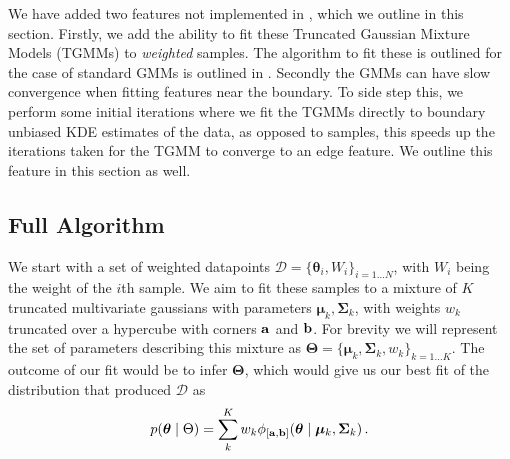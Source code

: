\documentclass[twocolumn,usenames,dvipsnames,linenumbers]{aastex631}
\newcommand{\btheta}{\boldsymbol{\theta}}
\newcommand{\bmu}{\boldsymbol{\mu}}
\newcommand{\bSigma}{\boldsymbol{\Sigma}}
\newcommand{\ba}{{\bf a}}
\newcommand{\bb}{{\bf b}}
\newcommand{\bTheta}{\boldsymbol{\Theta}}
\begin{document}
We have added two features not implemented in \cite{Lee2012}, which we outline in this section. Firstly, we add the ability to fit these Truncated Gaussian Mixture Models (TGMMs) to \textit{weighted} samples. The algorithm to fit these is outlined for the case of standard GMMs is outlined in \cite{frisch2021gaussianmixtureestimationweighted}. 
Secondly the GMMs can have slow convergence when fitting features near the boundary. To side step this, we perform some initial iterations where we fit the TGMMs directly to boundary unbiased KDE estimates of the data, as opposed to samples, this speeds up the iterations taken for the TGMM to converge to an edge feature. We outline this feature in this section as well.

\subsection{Full Algorithm}
We start with a set of weighted datapoints  $\mathcal{D} = \{\btheta_i, W_i\}_{i=1\dots N}$, with $W_i$ being the weight of the $i$th sample. We aim to fit these samples to a mixture of $K$ truncated multivariate gaussians with parameters $\bmu_k, \bSigma_k$, with weights $w_k$ truncated over a hypercube with corners ${\bf a}$ and ${\bf b}$. For brevity we will represent the set of parameters describing this mixture as $\bTheta = \{\bmu_k, \bSigma_k, w_k\}_{k=1\dots K}$.
The outcome of our fit would be to infer $\bTheta$, which would give us our best fit of the distribution that produced $\mathcal D$ as
\begin{equation}
	p(\btheta\mid \mathcal \bTheta) = \sum_k^K w_k \phi_{[\ba, \bb]}(\btheta \mid \bmu_k, \bSigma_k)\,.
\end{equation}
\end{document}
